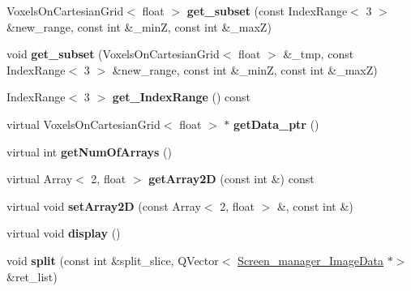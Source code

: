 \begin{DoxyCompactItemize}
\mbox{\label{classScreen__manager__ImageData_a70e5f3c33181d6e4747507b0e64dbd8c}} 
Voxels\+On\+Cartesian\+Grid$<$ float $>$ {\bfseries get\+\_\+subset} (const Index\+Range$<$ 3 $>$ \&new\+\_\+range, const int \&\+\_\+minZ, const int \&\+\_\+maxZ)
\item 
\mbox{\label{classScreen__manager__ImageData_af4f49a263400404afc11e60f2cec6dc3}} 
void {\bfseries get\+\_\+subset} (Voxels\+On\+Cartesian\+Grid$<$ float $>$ \&\+\_\+tmp, const Index\+Range$<$ 3 $>$ \&new\+\_\+range, const int \&\+\_\+minZ, const int \&\+\_\+maxZ)
\item 
\mbox{\label{classScreen__manager__ImageData_a65b825f8b263a44fa7051718c8d20393}} 
Index\+Range$<$ 3 $>$ {\bfseries get\+\_\+\+Index\+Range} () const
\item 
\mbox{\label{classScreen__manager__ImageData_a104cb0590753cd20fb2b2c027a451d68}} 
virtual Voxels\+On\+Cartesian\+Grid$<$ float $>$ $\ast$ {\bfseries get\+Data\+\_\+ptr} ()
\item 
\mbox{\label{classScreen__manager__ImageData_ae65fbfbe7d3a9aa39b15e5438b18e47f}} 
virtual int {\bfseries get\+Num\+Of\+Arrays} ()
\item 
\mbox{\label{classScreen__manager__ImageData_a8c814021e716030a78e68991132095cd}} 
virtual Array$<$ 2, float $>$ {\bfseries get\+Array2D} (const int \&) const
\item 
\mbox{\label{classScreen__manager__ImageData_a27813e2dfc1bf53b8f82bca9451b8686}} 
virtual void {\bfseries set\+Array2D} (const Array$<$ 2, float $>$ \&, const int \&)
\item 
\mbox{\label{classScreen__manager__ImageData_a1a50b73c42c5991bd0491c16dfebfa74}} 
virtual void {\bfseries display} ()
\item 
\mbox{\label{classScreen__manager__ImageData_a06b0b13e9e13016877ce148a6fbea5d9}} 
void {\bfseries split} (const int \&split\+\_\+slice, Q\+Vector$<$ \mbox{\hyperlink{classScreen__manager__ImageData}{Screen\+\_\+manager\+\_\+\+Image\+Data}} $\ast$$>$ \&ret\+\_\+list)
$$
\end{DoxyCompactItemize}
